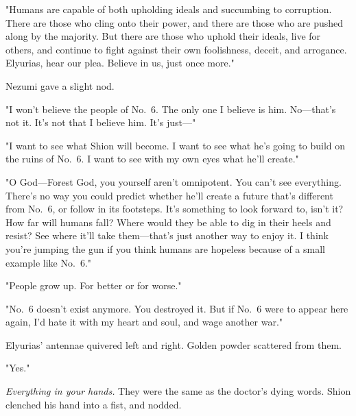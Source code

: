 "Humans are capable of both upholding ideals and succumbing to
corruption. There are those who cling onto their power, and there are
those who are pushed along by the majority. But there are those who
uphold their ideals, live for others, and continue to fight against
their own foolishness, deceit, and arrogance. Elyurias, hear our plea.
Believe in us, just once more."


Nezumi gave a slight nod.


"I won't believe the people of No.~6. The only one I believe is him.
No---that's not it. It's not that I believe him. It's just---"


"I want to see what Shion will become. I want to see what he's going to
build on the ruins of No.~6. I want to see with my own eyes what he'll
create."


"O God---Forest God, you yourself aren't omnipotent. You can't see
everything. There's no way you could predict whether he'll create a
future that's different from No.~6, or follow in its footsteps. It's
something to look forward to, isn't it? How far will humans fall? Where
would they be able to dig in their heels and resist? See where it'll
take them---that's just another way to enjoy it. I think you're jumping
the gun if you think humans are hopeless because of a small example like
No.~6."


"People grow up. For better or for worse."


"No.~6 doesn't exist anymore. You destroyed it. But if No.~6 were to
appear here again, I'd hate it with my heart and soul, and wage another
war."

Elyurias' antennae quivered left and right. Golden powder scattered from
them.


"Yes."


\emph{Everything in your hands.} They were the same as the doctor's dying
words. Shion clenched his hand into a fist, and nodded.


